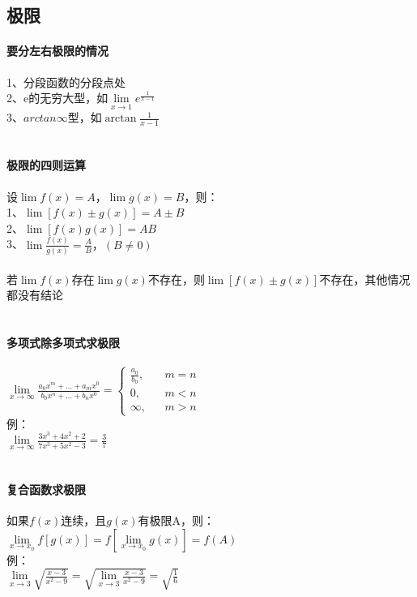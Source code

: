 \documentclass{article}
\begin{document}
\begin{flushleft}
\subsection{极限}

\paragraph{要分左右极限的情况}
1、分段函数的分段点处\\
2、e的无穷大型，如$\lim\limits_{x\to 1} e^{\frac{1}{x-1}}$\\
3、$arctan\infty$型，如$\arctan{\frac{1}{x-1}}$\\
~\\
\paragraph{极限的四则运算}
设$\lim f(x)=A，\lim g(x)=B$，则：\\
1、$\lim [f(x)\pm g(x)]=A\pm B$\\
2、$\lim [f(x)g(x)]=AB$\\
3、$\lim \frac{f(x)}{g(x)} =\frac{A}{B}，(B\neq 0)$\\
~\\
若$\lim f(x)$存在$\lim g(x)$不存在，则$\lim [f(x)\pm g(x)]$不存在，其他情况都没有结论\\
~\\
\paragraph{多项式除多项式求极限}
$\lim\limits_{x\to \infty} \frac{a_0x^m+...+a_mx^0}{b_0x^n+...+b_nx^0}=
\left\{
\begin{array}{rcl}
\frac{a_0}{b_0},& & {m=n}\\
0,& & {m<n}\\
\infty,& & {m>n}
\end{array} \right.$\\
例：\\
$\lim\limits_{x\to \infty} \frac{3x^3+4x^2+2}{7x^3+5x^2-3} = \frac{3}{7}$\\
~\\
\paragraph{复合函数求极限}
如果$f(x)$连续，且$g(x)$有极限A，则：\\
$\lim\limits_{x\to x_0} f[g(x)]=f[\lim\limits_{x\to x_0}g(x)]=f(A)$\\
例：\\
$\lim\limits_{x\to 3} \sqrt{\frac{x-3}{x^2-9}}= \sqrt{\lim\limits_{x\to 3} \frac{x-3}{x^2-9}}=\sqrt{\frac{1}{6}}$\\
~\\

\end{flushleft}
\end{document}
